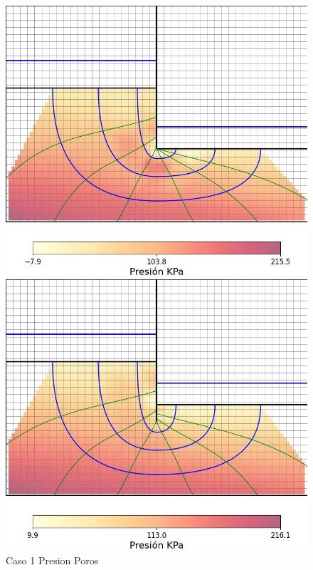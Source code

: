 \begin{figure}[H]
    \centering
    \begin{minipage}{0.32\textwidth}
        \centering
        \includegraphics[width=\textwidth]{GRAFICOS/caso_1_presion_poros.jpg}
        \caption{Caso 1 Presion Poros}
        \label{fig:caso_1_presion_poros}
    \end{minipage}
    \begin{minipage}{0.32\textwidth}
        \centering
        \includegraphics[width=\textwidth]{GRAFICOS/caso_2_presion_poros.jpg}

\end{minipage}
\end{figure}
